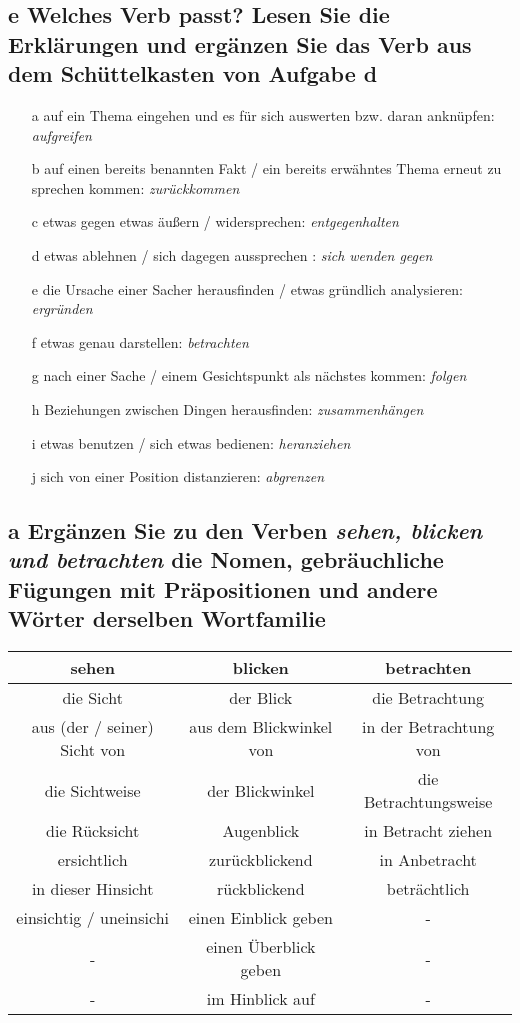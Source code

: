 \documentclass{article}
\begin{document}
	\subsection*{\textbf{e} Welches Verb passt? Lesen Sie die Erklärungen und ergänzen Sie das Verb aus dem Schüttelkasten von Aufgabe d}
	\begin{itemize}
			\item[a]{auf ein Thema eingehen und es für sich auswerten bzw. daran anknüpfen: \textit{aufgreifen}}
			\item[b]{auf einen bereits benannten Fakt / ein bereits erwähntes Thema erneut zu sprechen kommen: \textit{zurückkommen}}
			\item[c]{etwas gegen etwas äußern / widersprechen: \textit{entgegenhalten}}
			\item[d]{etwas ablehnen / sich dagegen aussprechen : \textit{sich wenden gegen}}
			\item[e]{die Ursache einer Sacher herausfinden / etwas gründlich analysieren: \textit{ergründen}}
			\item[f]{etwas genau darstellen: \textit{betrachten}}
			\item[g]{nach einer Sache / einem Gesichtspunkt als nächstes kommen: \textit{folgen}}
			\item[h]{Beziehungen zwischen Dingen herausfinden: \textit{zusammenhängen}}
			\item[i]{etwas benutzen / sich etwas bedienen: \textit{heranziehen}}
			\item[j]{sich von einer Position distanzieren: \textit{abgrenzen}}
	\end{itemize}
	\subsection*{\textbf{a} Ergänzen Sie zu den Verben \textit{sehen, blicken und betrachten} die Nomen, gebräuchliche Fügungen mit Präpositionen und andere Wörter derselben Wortfamilie}
	\begin{tabular}{| c | c | c |}
		\toprule
		\textbf{sehen} & \textbf{blicken} & \textbf{betrachten}\\ \midrule
		die Sicht & der Blick & die Betrachtung \\
		aus (der / seiner) Sicht von & aus dem Blickwinkel von & in der Betrachtung von \\
		die Sichtweise & der Blickwinkel & die Betrachtungsweise \\
		die Rücksicht & Augenblick & in Betracht ziehen \\
		ersichtlich & zurückblickend & in Anbetracht \\
		in dieser Hinsicht & rückblickend & beträchtlich \\
		einsichtig / uneinsichi & einen Einblick geben & - \\
		- & einen Überblick geben & - \\
		- & im Hinblick auf & - \\
		\bottomrule
	\end{tabular}
\end{document}

